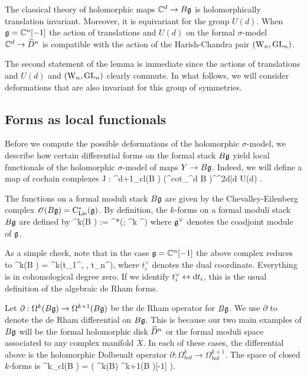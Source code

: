 \documentclass[10pt]{amsart}
\begin{document}
\begin{lem}
The classical theory of holomorphic maps $\mathbb C^d \to B \mathfrak g$ is holomorphically translation invariant. 
Moreover, it is equivariant for the group $U(d)$. 
When $\mathfrak g = \mathbb C^n[-1]$ the action of translations and $U(d)$ on the formal $\sigma$-model $\mathbb C^d \to \widehat{D}^n$ is compatible with the action of the Harish-Chandra pair $({{\rm W}_n}, {\rm GL}_n)$. 
\end{lem}

The second statement of the lemma is immediate since the actions of translations and $U(d)$ and $({{\rm W}_n}, {\rm GL}_n)$ clearly commute.
In what follows, we will consider deformations that are also invariant for this group of symmetries. 

\subsection{Forms as local functionals} \label{sec: forms to local}

Before we compute the possible deformations of the holomorphic $\sigma$-model, we describe how certain differential forms on the formal stack $B \mathfrak g$ yield local functionals of the holomorphic $\sigma$-model of maps $Y \to B \mathfrak g$. 
Indeed, we will define a map of cochain complexes
\ben
J : \Omega^{d+1}_{cl}(B \fg) \to \left(\Def^{\rm cot}_{\CC^d \to B \fg}\right)^{\CC^{2d|d} \ltimes U(d)} .
\een

The functions on a formal moduli stack $B \mathfrak g$ are given by the Chevalley-Eilenberg complex $\mathscr O(B\mathfrak g) = {\rm C}_{{\rm Lie}}^*(\mathfrak g)$.
By definition, the $k$-forms on a formal moduli stack $B\mathfrak g$ are defined by
\ben
\Omega^k(B \fg) := \clie^*(\fg ; \Sym^k \fg^\vee [-k])
\een
where $\mathfrak g^\vee$ denotes the coadjoint module of $\mathfrak g$. 

As a simple check, note that in the case $\mathfrak g = \mathbb C^n [-1]$ the above complex reduces to
\ben
\Omega^k(B \fg) = \CC[t_1,\ldots, t_n] \tensor \wedge^k(t_1^\vee, \cdots, t_n^\vee),
\een
where $t_i^\vee$ denotes the dual coordinate. 
Everything is in cohomological degree zero.
If we identify $t_i^\vee \leftrightarrow {\rm d} t_i$, this is the usual definition of the algebraic de Rham forms. 

Let $\partial : \Omega^{k}(B\mathfrak g) \to \Omega^{k+1}(B\mathfrak g)$ be the de Rham operator for $B\mathfrak g$. 
We use $\partial$ to denote the de Rham differential on $B \mathfrak g$. 
This is because our two main examples of $B \mathfrak g$ will be the formal holomorphic disk $\widehat{D}^n$ or the formal moduli space associated to any complex manifold $X$. 
In each of these cases, the differential above is the holomorphic Dolbeualt operator $\partial : \Omega^k_{hol} \to \Omega^{k+1}_{hol}$.
The space of closed $k$-forms is
\ben
\hOmega^{k}_{cl}(B \fg) = \left( \Omega^k(B\fg) \xto{\partial} \Omega^{k+1}(B \fg)[-1] \to \cdots \right).
\een
\end{document}
